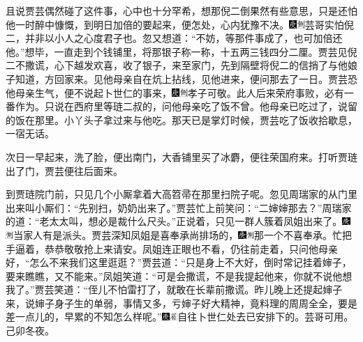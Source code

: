 且说贾芸偶然碰了这件事，心中也十分罕希，想那倪二倒果然有些意思，只是还怕他一时醉中慷慨，到明日加倍的要起来，便怎处，心内犹豫不决。{\includegraphics[width=3mm]{../Images/00004}\includegraphics[width=3mm]{../Images/00011}\footnotesize \kaishu 芸哥实怕倪二，并非以小人之心度君子也。}忽又想道：“不妨，等那件事成了，也可加倍还他。”想毕，一直走到个钱铺里，将那银子称一称，十五两三钱四分二厘。贾芸见倪二不撒谎，心下越发欢喜，收了银子，来至家门，先到隔壁将倪二的信捎了与他娘子知道，方回家来。见他母亲自在炕上拈线，见他进来，便问那去了一日。贾芸恐他母亲生气，便不说起卜世仁的事来，{\includegraphics[width=3mm]{../Images/00004}\includegraphics[width=3mm]{../Images/00011}\footnotesize \kaishu 孝子可敬。此人后来荣府事败，必有一番作为。}只说在西府里等琏二叔的，问他母亲吃了饭不曾。他母亲已吃过了，说留的饭在那里。小丫头子拿过来与他吃。那天已是掌灯时候，贾芸吃了饭收拾歇息，一宿无话。

次日一早起来，洗了脸，便出南门，大香铺里买了冰麝，便往荣国府来。打听贾琏出了门，贾芸便往后面来。

到贾琏院门前，只见几个小厮拿着大高笤帚在那里扫院子呢。忽见周瑞家的从门里出来叫小厮们：“先别扫，奶奶出来了。”贾芸忙上前笑问：“二婶婶那去？”周瑞家的道：“老太太叫，想必是裁什么尺头。”正说着，只见一群人簇着凤姐出来了。{\includegraphics[width=3mm]{../Images/00004}\includegraphics[width=3mm]{../Images/00011}\footnotesize \kaishu 当家人有是派头。}贾芸深知凤姐是喜奉承尚排场的，{\includegraphics[width=3mm]{../Images/00004}\includegraphics[width=3mm]{../Images/00011}\footnotesize \kaishu 那一个不喜奉承。}忙把手逼着，恭恭敬敬抢上来请安。凤姐连正眼也不看，仍往前走着，只问他母亲好，“怎么不来我们这里逛逛？”贾芸道：“只是身上不大好，倒时常记挂着婶子，要来瞧瞧，又不能来。”凤姐笑道：“可是会撒谎，不是我提起他来，你就不说他想我了。”贾芸笑道：“侄儿不怕雷打了，就敢在长辈前撒谎。昨儿晚上还提起婶子来，说婶子身子生的单弱，事情又多，亏婶子好大精神，竟料理的周周全全，要是差一点儿的，早累的不知怎么样呢。”{\includegraphics[width=3mm]{../Images/00004}\includegraphics[width=3mm]{../Images/00010}\footnotesize \kaishu 自往卜世仁处去已安排下的。芸哥可用。己卯冬夜。}

